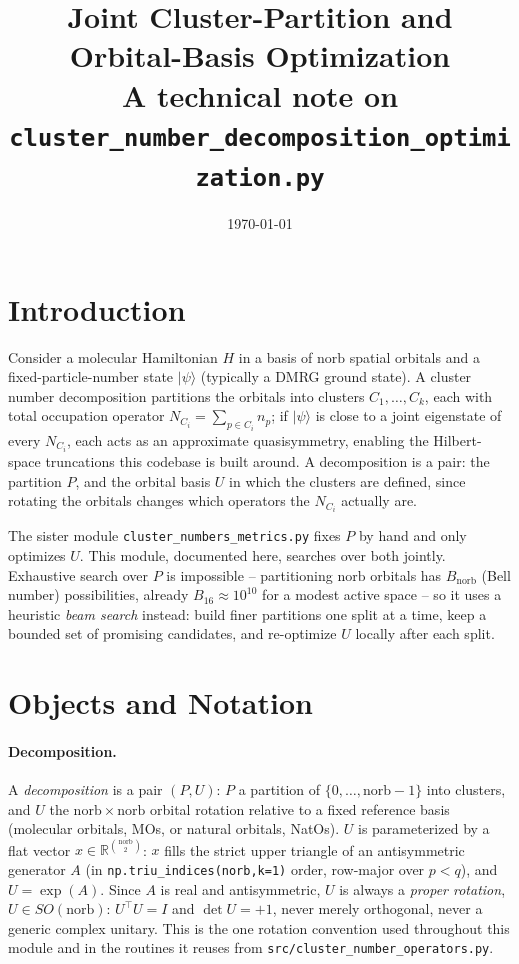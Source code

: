 \documentclass[10pt]{article}
\title{Joint Cluster-Partition and Orbital-Basis Optimization\\
\large A technical note on \texttt{cluster\_number\_decomposition\_optimization.py}}
\date{\today}
\author{}
\newcommand{\ket}[1]{\lvert #1 \rangle}
\begin{document}
\maketitle
\vspace{-2em}

\section{Introduction}

Consider a molecular Hamiltonian $H$ in a basis of $\mathrm{norb}$ spatial orbitals and a
fixed-particle-number state $\ket{\psi}$ (typically a DMRG ground state). A cluster number
decomposition partitions the orbitals into clusters $C_1,\dots,C_k$, each with total occupation
operator $N_{C_i}=\sum_{p\in C_i}n_p$; if $\ket{\psi}$ is close to a joint eigenstate of every
$N_{C_i}$, each acts as an approximate quasisymmetry, enabling the Hilbert-space truncations
this codebase is built around. A decomposition is a pair: the partition $P$, and the orbital
basis $U$ in which the clusters are defined, since rotating the orbitals changes which
operators the $N_{C_i}$ actually are.

The sister module \texttt{cluster\_numbers\_metrics.py} fixes $P$ by hand and only optimizes
$U$. This module, documented here, searches over both jointly. Exhaustive search over $P$ is
impossible -- partitioning $\mathrm{norb}$ orbitals has $B_{\mathrm{norb}}$ (Bell number)
possibilities, already $B_{16}\approx10^{10}$ for a modest active space -- so it uses a
heuristic \emph{beam search} instead: build finer partitions one split at a time, keep a
bounded set of promising candidates, and re-optimize $U$ locally after each split.

\section{Objects and Notation}

\paragraph{Decomposition.} A \emph{decomposition} is a pair $(P,U)$: $P$ a partition of
$\{0,\dots,\mathrm{norb}-1\}$ into clusters, and $U$ the $\mathrm{norb}\times\mathrm{norb}$
orbital rotation relative to a fixed reference basis (molecular orbitals, MOs, or natural
orbitals, NatOs). $U$ is parameterized by a flat vector $x\in\mathbb{R}^{\binom{\mathrm{norb}}{2}}$:
$x$ fills the strict upper triangle of an antisymmetric generator $A$ (in
\texttt{np.triu\_indices(norb,k=1)} order, row-major over $p<q$), and $U=\exp(A)$. Since $A$ is
real and antisymmetric, $U$ is always a \emph{proper rotation}, $U\in SO(\mathrm{norb})$:
$U^\top U=I$ and $\det U=+1$, never merely orthogonal, never a generic complex unitary. This is
the one rotation convention used throughout this module and in the routines it reuses from
\texttt{src/cluster\_number\_operators.py}.
\end{document}
